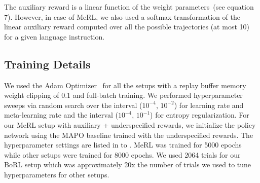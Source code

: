 The auxiliary reward is a linear function of the weight parameters~(see equation 7). However, in case of MeRL, we also used a softmax transformation of the linear auxiliary reward computed over all the possible trajectories (at most 10) for a given language instruction.

\subsection{Training Details}
We used the Adam Optimizer~\cite{kingma2014adam} for all the setups with a replay buffer memory weight clipping of 0.1 and full-batch training.
We performed hyperparameter sweeps via random search over the interval ($10^{-4}$, $10^{-2}$) for learning rate and meta-learning rate
and the interval ($10^{-4}$, $10^{-1}$) for entropy regularization. For our MeRL setup with auxiliary + underspecified rewards,
we initialize the policy network using the MAPO baseline trained with the underspecified rewards. The hyperparameter
settings are listed in  to . MeRL was trained for 5000 epochs while other setups were trained
for 8000 epochs. We used 2064 trials for our BoRL setup which was approximately 20x the number of trials we used to tune hyperparameters
for other setups.

